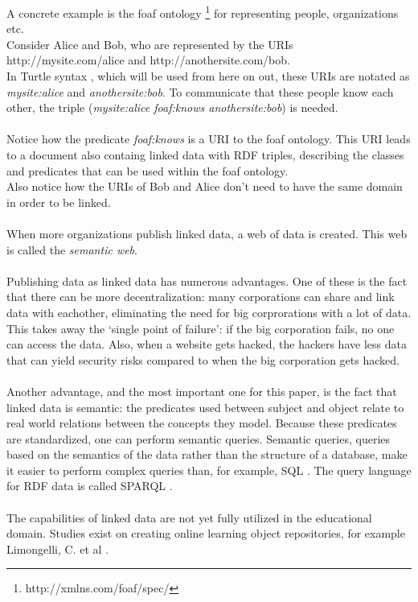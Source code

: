 \documentclass[a4paper]{report}
\begin{document}
    A concrete example is the foaf ontology \footnote{http://xmlns.com/foaf/spec/} for representing people, organizations etc.\\
    Consider Alice and Bob, who are represented by the URIs http://mysite.com/alice and http://anothersite.com/bob.\\
    In Turtle syntax \cite{turtle}, which will be used from here on out, these URIs are notated as \textit{mysite:alice} and \textit{anothersite:bob}.
    To communicate that these people know each other, the triple (\textit{mysite:alice foaf:knows anothersite:bob}) is needed.\\ \\
    Notice how the predicate \textit{foaf:knows} is a URI to the foaf ontology. This URI leads to a document also containg linked data with RDF triples, describing the classes and predicates that can be used within the foaf ontology.\\
    Also notice how the URIs of Bob and Alice don't need to have the same domain in order to be linked.\\ \\
    When more organizations publish linked data, a web of data is created. This web is called the \textit{semantic web}.\\ \\
    Publishing data as linked data has numerous advantages. One of these is the fact that there can be more decentralization: many corporations can share and link data with eachother, eliminating the need for big corprorations with a lot of data.
    This takes away the `single point of failure': if the big corporation fails, no one can access the data. Also, when a website gets hacked, the hackers have less data that can yield security risks compared to when the big corporation gets hacked.\\ \\
    Another advantage, and the most important one for this paper, is the fact that linked data is semantic: the predicates used between subject and object relate to real world relations between the concepts they model. Because these predicates are standardized, one can perform semantic queries.
    Semantic queries, queries based on the semantics of the data rather than the structure of a database, make it easier to perform complex queries than, for example, SQL \cite{sqlvsqparql}. The query language for RDF data is called SPARQL \cite{sparql}.\\ \\
    The capabilities of linked data are not yet fully utilized in the educational domain. Studies exist on creating online learning object repositories, for example Limongelli, C. et al \cite{olap}.\\
\end{document}
